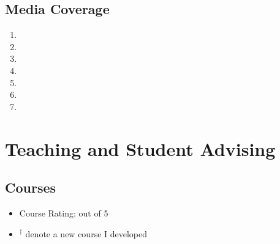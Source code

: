 \documentclass[11pt]{article}
\begin{document}
\subsection{Media Coverage}
\begin{enumerate}[label=M\arabic*]
    \item {}
    \item {}
    \item {}
    \item {}
    \item {}
    \item {}
    \item {}
\end{enumerate}





\section{Teaching and Student Advising}

\subsection{Courses}

\begin{itemize}[label={},before=\small]
    \item Course Rating: out of 5
    \item $^{\dagger}$ denote a new course I developed
\end{itemize}




\newcommand{\swe}[1]{SWE {#1}: OO Software Specification and Construction}
\end{document}
